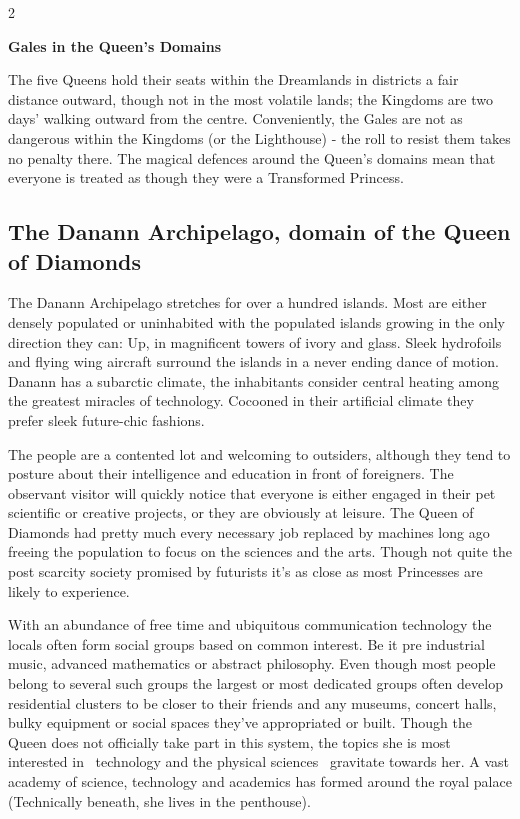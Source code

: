 \begin{multicols}{2}
\begin{mybox}
\textbf{Gales in the Queen's Domains}

The five Queens hold their seats within the Dreamlands in districts a fair distance outward, though not in the most volatile lands; the Kingdoms are two days' walking outward from the centre. Conveniently, the Gales are not as dangerous within the Kingdoms (or the Lighthouse) - the roll to resist them takes no penalty there. The magical defences around the Queen's domains mean that everyone is treated as though they were a Transformed Princess.\end{mybox}

\subsection*{The Danann Archipelago, domain of the Queen of Diamonds}
The Danann Archipelago stretches for over a hundred islands. Most are either densely populated or uninhabited with the populated islands growing in the only direction they can: Up, in magnificent towers of ivory and glass. Sleek hydrofoils and flying wing aircraft surround the islands in a never ending dance of motion. Danann has a subarctic climate, the inhabitants consider central heating among the greatest miracles of technology. Cocooned in their artificial climate they prefer sleek future-chic fashions.

The people are a contented lot and welcoming to outsiders, although they tend to posture about their intelligence and education in front of foreigners. The observant visitor will quickly notice that everyone is either engaged in their pet scientific or creative projects, or they are obviously at leisure. The Queen of Diamonds had pretty much every necessary job replaced by machines long ago freeing the population to focus on the sciences and the arts. Though not quite the post scarcity society promised by futurists it's as close as most Princesses are likely to experience.

With an abundance of free time and ubiquitous communication technology the locals often form social groups based on common interest. Be it pre industrial music, advanced mathematics or abstract philosophy. Even though most people belong to several such groups the largest or most dedicated groups often develop residential clusters to be closer to their friends and any museums, concert halls, bulky equipment or social spaces they've appropriated or built. Though the Queen does not officially take part in this system, the topics she is most interested in \textendash\, technology and the physical sciences \textendash\, gravitate towards her. A vast academy of science, technology and academics has formed around the royal palace (Technically beneath, she lives in the penthouse).


\end{multicols}
